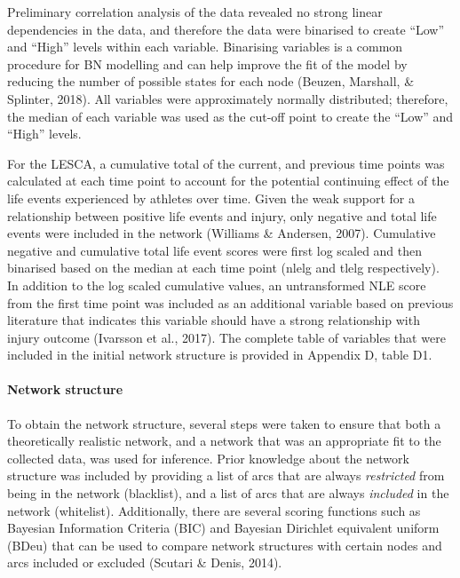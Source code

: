 \documentclass[man,floatsintext]{apa6}
\let\oldparagraph\paragraph
\renewcommand{\paragraph}[1]{\oldparagraph{#1}\mbox{}}
\begin{document}
Preliminary correlation analysis of the data revealed no strong linear dependencies in the data, and therefore the data were binarised to create \enquote{Low} and \enquote{High} levels within each variable.
Binarising variables is a common procedure for BN modelling and can help improve the fit of the model by reducing the number of possible states for each node (Beuzen, Marshall, \& Splinter, 2018).
All variables were approximately normally distributed; therefore, the median of each variable was used as the cut-off point to create the \enquote{Low} and \enquote{High} levels.

For the LESCA, a cumulative total of the current, and previous time points was calculated at each time point to account for the potential continuing effect of the life events experienced by athletes over time.
Given the weak support for a relationship between positive life events and injury, only negative and total life events were included in the network (Williams \& Andersen, 2007).
Cumulative negative and cumulative total life event scores were first log scaled and then binarised based on the median at each time point (nlelg and tlelg respectively).
In addition to the log scaled cumulative values, an untransformed NLE score from the first time point was included as an additional variable based on previous literature that indicates this variable should have a strong relationship with injury outcome (Ivarsson et al., 2017).
The complete table of variables that were included in the initial network structure is provided in Appendix D, table D1.

\hypertarget{network-structure}{%
\paragraph{Network structure}\label{network-structure}}

To obtain the network structure, several steps were taken to ensure that both a theoretically realistic network, and a network that was an appropriate fit to the collected data, was used for inference.
Prior knowledge about the network structure was included by providing a list of arcs that are always \emph{restricted} from being in the network (blacklist), and a list of arcs that are always \emph{included} in the network (whitelist).
Additionally, there are several scoring functions such as Bayesian Information Criteria (BIC) and Bayesian Dirichlet equivalent uniform (BDeu) that can be used to compare network structures with certain nodes and arcs included or excluded (Scutari \& Denis, 2014).
\end{document}
